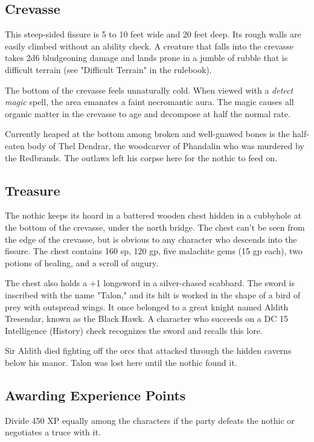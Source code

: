 \documentclass[10pt,a4paper,twoside,bg=print,twocolumn,openany,nodeprecatedcode]{dndbook}
\begin{document}
\subsection{Crevasse}
This steep-sided fissure is 5 to 10 feet wide and 20 feet deep. Its rough walls are easily climbed without an ability check. A creature that falls into the crevasse takes 2d6 bludgeoning damage and lands prone in a jumble of rubble that is difficult terrain (see "Difficult Terrain" in the rulebook).

The bottom of the crevasse feels unnaturally cold. When viewed with a \textit{detect magic} spell, the area emanates a faint necromantic aura. The magic causes all organic matter in the crevasse to age and decompose at half the normal rate.

Currently heaped at the bottom among broken and well-gnawed bones is the half-eaten body of Thel Dendrar, the woodcarver of Phandalin who was murdered by the Redbrands. The outlaws left his corpse here for the nothic to feed on.

\subsection{Treasure}
The nothic keeps its hoard in a battered wooden chest hidden in a cubbyhole at the bottom of the crevasse, under the north bridge. The chest can't be seen from the edge of the crevasse, but is obvious to any character who descends into the fissure. The chest contains 160 sp, 120 gp, five malachite gems (15 gp each), two potions of healing, and a scroll of augury.

The chest also holds a +1 longsword in a silver-chased scabbard. The sword is inscribed with the name "Talon," and its hilt is worked in the shape of a bird of prey with outspread wings. It once belonged to a great knight named Aldith Tresendar, known as the Black Hawk. A character who succeeds on a DC 15 Intelligence (History) check recognizes the sword and recalls this lore.

Sir Aldith died fighting off the orcs that attacked through the hidden caverns below his manor. Talon was lost here until the nothic found it.

\subsection{Awarding Experience Points}
Divide 450 XP equally among the characters if the party defeats the nothic or negotiates a truce with it.
\end{document}
